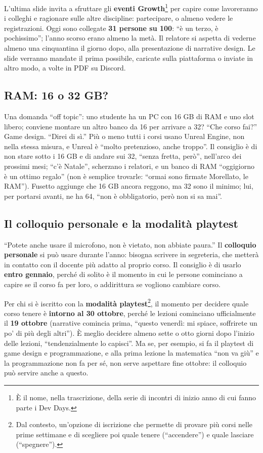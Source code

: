 L'ultima slide invita a sfruttare gli \textbf{eventi Growth}\footnote{È il
nome, nella trascrizione, della serie di incontri di inizio anno di cui fanno
parte i Dev Days.} per capire come lavoreranno i colleghi e ragionare sulle
altre discipline: partecipare, o almeno vedere le registrazioni. Oggi sono
collegate \textbf{31 persone su 100}: ``è un terzo, è pochissimo''; l'anno
scorso erano almeno la metà. Il relatore si aspetta di vederne almeno una
cinquantina il giorno dopo, alla presentazione di narrative design. Le slide
verranno mandate il prima possibile, caricate sulla piattaforma o inviate
in altro modo, a volte in PDF su Discord.

\subsection{RAM: 16 o 32 GB?}

Una domanda ``off topic'': uno studente ha un PC con 16 GB di RAM e uno slot
libero; conviene montare un altro banco da 16 per arrivare a 32? ``Che corso
fai?'' Game design. ``Direi di sì.'' Più o meno tutti i corsi usano Unreal
Engine, non nella stessa misura, e Unreal è ``molto pretenzioso, anche
troppo''. Il consiglio è di non stare sotto i 16 GB e di andare sui 32,
``senza fretta, però'', nell'arco dei prossimi mesi; ``c'è Natale'',
scherzano i relatori, e un banco di RAM ``oggigiorno è un ottimo regalo'' (non
è semplice trovarle: ``ormai sono firmate Morellato, le RAM''). Fusetto
aggiunge che 16 GB ancora reggono, ma 32 sono il minimo; lui, per portarsi
avanti, ne ha 64, ``non è obbligatorio, però non si sa mai''.

\subsection{Il colloquio personale e la modalità playtest}

``Potete anche usare il microfono, non è vietato, non abbiate paura.'' Il
\textbf{colloquio personale} si può usare durante l'anno: bisogna scrivere
in segreteria, che metterà in contatto con il docente più adatto al proprio
corso. Il consiglio è di usarlo \textbf{entro gennaio}, perché di solito è
il momento in cui le persone cominciano a capire se il corso fa per loro, o
addirittura se vogliono cambiare corso.

Per chi si è iscritto con la \textbf{modalità playtest}\footnote{Dal
contesto, un'opzione di iscrizione che permette di provare più corsi nelle
prime settimane e di scegliere poi quale tenere (``accendere'') e quale
lasciare (``spegnere'').}, il momento per decidere quale corso tenere è
\textbf{intorno al 30 ottobre}, perché le lezioni cominciano ufficialmente
il \textbf{19 ottobre} (narrative comincia prima, ``questo venerdì: mi
spiace, soffrirete un po' di più degli altri''). È meglio decidere almeno
sette o otto giorni dopo l'inizio delle lezioni, ``tendenzialmente lo
capisci''. Ma se, per esempio, si fa il playtest di game design e
programmazione, e alla prima lezione la matematica ``non va giù'' e la
programmazione non fa per sé, non serve aspettare fine ottobre: il colloquio
può servire anche a questo.

